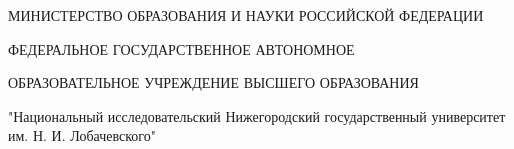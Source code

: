 \documentclass[../main.tex]{subfiles}
\begin{document}
    \begin{center}
        МИНИСТЕРСТВО ОБРАЗОВАНИЯ И НАУКИ РОССИЙСКОЙ ФЕДЕРАЦИИ

        ФЕДЕРАЛЬНОЕ ГОСУДАРСТВЕННОЕ АВТОНОМНОЕ

        ОБРАЗОВАТЕЛЬНОЕ УЧРЕЖДЕНИЕ ВЫСШЕГО ОБРАЗОВАНИЯ
        
        "Национальный исследовательский Нижегородский государственный университет им. Н. И. Лобачевского"
    \end{center}
    

    \newpage
\end{document}
